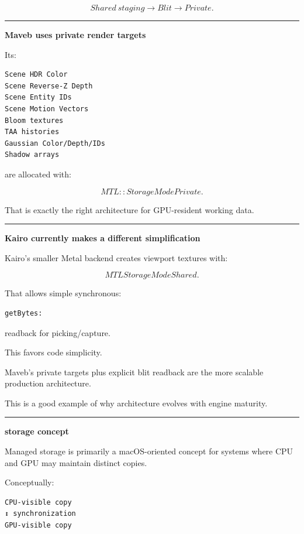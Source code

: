 \[
Shared\ staging
\rightarrow
Blit
\rightarrow
Private.
\]

\begin{center}\rule{0.5\linewidth}{0.5pt}\end{center}

\textbf{Maveb uses private render targets}

Its:

\begin{verbatim}
Scene HDR Color
Scene Reverse-Z Depth
Scene Entity IDs
Scene Motion Vectors
Bloom textures
TAA histories
Gaussian Color/Depth/IDs
Shadow arrays
\end{verbatim}

are allocated with:

\[
MTL::StorageModePrivate.
\]

That is exactly the right architecture for GPU-resident working data.

\begin{center}\rule{0.5\linewidth}{0.5pt}\end{center}

\textbf{Kairo currently makes a different simplification}

Kairo's smaller Metal backend creates viewport textures with:

\[
MTLStorageModeShared.
\]

That allows simple synchronous:

\begin{verbatim}
getBytes:
\end{verbatim}

readback for picking/capture.

This favors code simplicity.

Maveb's private targets plus explicit blit readback are the more scalable production architecture.

This is a good example of why architecture evolves with engine maturity.

\begin{center}\rule{0.5\linewidth}{0.5pt}\end{center}

\textbf{ storage concept}

Managed storage is primarily a macOS-oriented concept for systems where CPU and GPU may maintain distinct copies.

Conceptually:

\begin{verbatim}
CPU-visible copy
↕ synchronization
GPU-visible copy
\end{verbatim}

